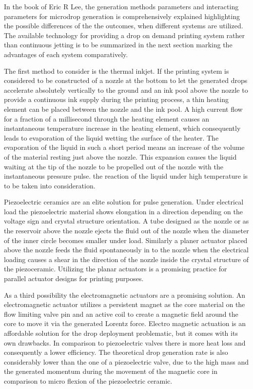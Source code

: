 In the book of Eric R Lee, the generation methods parameters and interacting parameters for microdrop generation is comprehensively explained highlighting the possible differences of the the outcomes, when different systems are utilized. The available technology for providing a drop on demand printing system rather than continuous jetting is to be summarized in the next section marking the advantages of each system comparatively.  

The first method to consider is the thermal inkjet.  If the printing system is considered to be constructed of a nozzle at the bottom to let the generated drops accelerate absolutely vertically to the ground and an ink pool above the nozzle to provide a continuous ink supply during the printing process, a thin heating element can be placed between the nozzle and the ink pool. A high current flow for a fraction of a millisecond through the heating element causes an instantaneous temperature increase in the heating element, which consequently leads to evaporation of the liquid wetting the surface of the heater. The evaporation of the liquid in such a short period means an increase of the volume of the material resting just above the nozzle. This expansion causes the liquid waiting at the tip of the nozzle to be propelled out of the nozzle with the instantaneous pressure pulse. the reaction of the liquid under high temperature is to be taken into consideration.

Piezoelectric ceramics are an elite solution for pulse generation. Under electrical load the piezoelectric material shows elongation in a direction depending on the voltage sign and crystal structure orientation. A tube designed as the nozzle or as the reservoir above the nozzle ejects the fluid out of the nozzle when the diameter of the inner circle becomes smaller under load. Similarly a planer actuator placed above the nozzle feeds the fluid spontaneously in to the nozzle when the electrical loading causes a shear in the direction of the nozzle inside the crystal structure of the piezoceramic. Utilizing the planar actuators is a promising practice for parallel actuator designs for printing purposes.\citep{lee2002microdrop}

As a third possibility the electromagnetic actuators are a promising solution. An electromagnetic actuator utilizes a persistent magnet as the core material on the flow limiting valve pin and an active coil to create a magnetic field around the core to move it via the generated Lorentz force. Electro magnetic actuation is an affordable solution for the drop deployment problematic, but it comes with its own drawbacks. In comparison to piezoelectric valves there is more heat loss and consequently a lower efficiency. The theoretical drop generation rate is also considerably lower than the one of a piezoelectric valve, due to the high mass and the generated momentum during the movement of the magnetic core in comparison to micro flexion of the piezoelectric ceramic.\citep{nguyen2002fundamentals}


